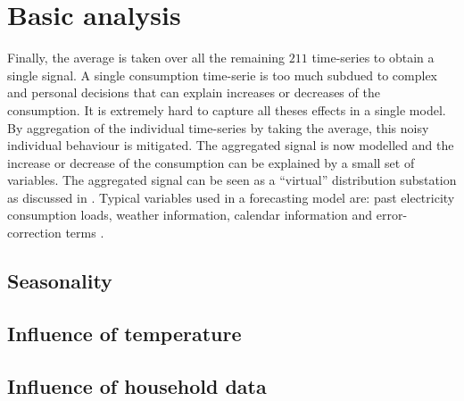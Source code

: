 \section{Basic analysis}
Finally, the average is taken over all the remaining $211$ time-series to obtain a single signal. A single consumption time-serie is too much subdued to complex and personal decisions that can explain increases or decreases of the consumption. It is extremely hard to capture all theses effects in a single model. By aggregation of the individual time-series by taking the average, this noisy individual behaviour is mitigated. The aggregated signal is now modelled and the increase or decrease of the consumption can be explained by a small set of variables. The aggregated signal can be seen as a ``virtual'' distribution substation as discussed in \cite{Hoverstad2015}. Typical variables used in a forecasting model are: past electricity consumption loads, weather information, calendar information and error-correction terms \cite{loadforecastingmoor}.

\subsection{Seasonality}




\subsection{Influence of temperature}

\subsection{Influence of household data}


